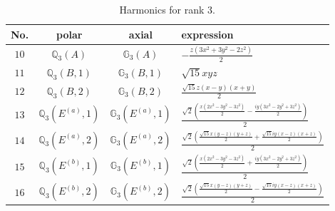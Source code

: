 \documentclass[fleqn,8pt,landscape]{jsarticle}
\begin{document}
\begin{table}[ht!]
\begin{center}
\caption{Harmonics for rank 3.}
\renewcommand{\arraystretch}{1.3}
\begin{tabular}{cccl} \hline \hline
No. & polar & axial & expression \\ \hline
$ 10 $ & $ \mathbb{Q}_{3}(A) $ & $ \mathbb{G}_{3}(A) $ & $ - \frac{z \left(3 x^{2} + 3 y^{2} - 2 z^{2}\right)}{2} $ \\
$ 11 $ & $ \mathbb{Q}_{3}(B,1) $ & $ \mathbb{G}_{3}(B,1) $ & $ \sqrt{15} x y z $ \\
$ 12 $ & $ \mathbb{Q}_{3}(B,2) $ & $ \mathbb{G}_{3}(B,2) $ & $ \frac{\sqrt{15} z \left(x - y\right) \left(x + y\right)}{2} $ \\
$ 13 $ & $ \mathbb{Q}_{3}(E^{(a)},1) $ & $ \mathbb{G}_{3}(E^{(a)},1) $ & $ \frac{\sqrt{2} \left(\frac{x \left(2 x^{2} - 3 y^{2} - 3 z^{2}\right)}{2} - \frac{i y \left(3 x^{2} - 2 y^{2} + 3 z^{2}\right)}{2}\right)}{2} $ \\
$ 14 $ & $ \mathbb{Q}_{3}(E^{(a)},2) $ & $ \mathbb{G}_{3}(E^{(a)},2) $ & $ \frac{\sqrt{2} \left(\frac{\sqrt{15} x \left(y - z\right) \left(y + z\right)}{2} + \frac{\sqrt{15} i y \left(x - z\right) \left(x + z\right)}{2}\right)}{2} $ \\
$ 15 $ & $ \mathbb{Q}_{3}(E^{(b)},1) $ & $ \mathbb{G}_{3}(E^{(b)},1) $ & $ \frac{\sqrt{2} \left(\frac{x \left(2 x^{2} - 3 y^{2} - 3 z^{2}\right)}{2} + \frac{i y \left(3 x^{2} - 2 y^{2} + 3 z^{2}\right)}{2}\right)}{2} $ \\
$ 16 $ & $ \mathbb{Q}_{3}(E^{(b)},2) $ & $ \mathbb{G}_{3}(E^{(b)},2) $ & $ \frac{\sqrt{2} \left(\frac{\sqrt{15} x \left(y - z\right) \left(y + z\right)}{2} - \frac{\sqrt{15} i y \left(x - z\right) \left(x + z\right)}{2}\right)}{2} $ \\
 \hline \hline
\end{tabular}
\end{center}
\end{table}
\end{document}
